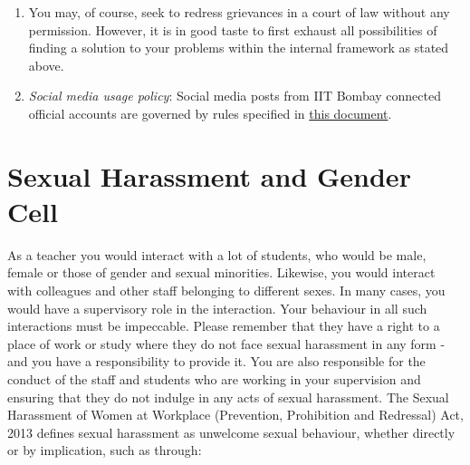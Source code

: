 \documentclass[
  10pt,
  a5paper,
  10pt,
  openany]{amsbook}
\begin{document}
\begin{enumerate}
  it out by meeting the concerned Dean, the Deputy Directors or the
  Director. If you would like to make a written representation, the
  first course is the Director. If his response leaves you dissatisfied,
  you may make representation to the Chairperson of the Board. Such
  representation should go through, Head, concerned Dean, Director and
  the Chairperson in that order. In extreme cases, you may take your
  grievance to the Visitor (who is the President of India). However, in
  all cases, you should go through what is known as proper channel, that
  is, route all your representation through HOD, Director and the
  Chairperson, in that order. The forwarding authority does not have the
  right to stop your representation being forwarded upwards excepting in
  circumstances such as (i) a similar petition made earlier has been
  disposed of and no new facts are brought out in the new petition, (ii)
  your representation is not to the appropriate authority, or (iii) the
  petition is against a decision which is final by any law or statute.
  In such cases, the appropriate authority will write you a reply
  explaining the reasons why your petition may not be forwarded.
\item
  You may, of course, seek to redress grievances in a court of law
  without any permission. However, it is in good taste to first exhaust
  all possibilities of finding a solution to your problems within the
  internal framework as stated above.
\item
  \emph{Social media usage policy}: Social media posts from IIT Bombay
  connected official accounts are governed by rules specified in
  \href{https://www.iitb.ac.in/sites/www.iitb.ac.in/files/Guidelines\%20For\%20Use\%20Of\%20Offical\%20IIT\%20Bombay\%20Accounts\%20On\%20Social\%20Media_2.pdf}{this
  document}.
\end{enumerate}

\section{Sexual Harassment and Gender
Cell}\label{sexual-harassment-and-gender-cell}

As a teacher you would interact with a lot of students, who would be
male, female or those of gender and sexual minorities. Likewise, you
would interact with colleagues and other staff belonging to different
sexes. In many cases, you would have a supervisory role in the
interaction. Your behaviour in all such interactions must be impeccable.
Please remember that they have a right to a place of work or study where
they do not face sexual harassment in any form - and you have a
responsibility to provide it. You are also responsible for the conduct
of the staff and students who are working in your supervision and
ensuring that they do not indulge in any acts of sexual harassment. The
Sexual Harassment of Women at Workplace (Prevention, Prohibition and
Redressal) Act, 2013 defines sexual harassment as unwelcome sexual
behaviour, whether directly or by implication, such as through:
\end{document}
